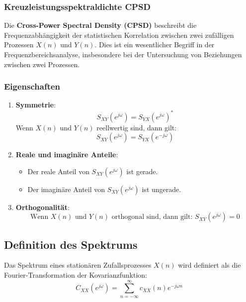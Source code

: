\documentclass[12pt]{article}
\begin{document}
   \subsubsection{Kreuzleistungsspektraldichte CPSD}
      Die \textbf{Cross-Power Spectral Density (CPSD)} beschreibt die Frequenzabhängigkeit der statistischen Korrelation zwischen zwei zufälligen Prozessen \(X(n)\) und \(Y(n)\). Dies ist ein wesentlicher Begriff in der Frequenzbereichsanalyse, insbesondere bei der Untersuchung von Beziehungen zwischen zwei Prozessen.

   \subsubsection*{Eigenschaften}
      \begin{enumerate}
      \item \textbf{Symmetrie}:
      \[
         S_{XY}(e^{j\omega}) = S_{YX}(e^{j\omega})^*  %
      \]
      Wenn \(X(n)\) und \(Y(n)\) reellwertig sind, dann gilt:
      \[
         S_{XY}(e^{j\omega}) = S_{YX}(e^{-j\omega})
      \]

      \item \textbf{Reale und imaginäre Anteile}:
      \begin{itemize}
         \item Der reale Anteil von \(S_{XY}(e^{j\omega})\) ist gerade.
         \item Der imaginäre Anteil von \(S_{XY}(e^{j\omega})\) ist ungerade.
      \end{itemize}

      \item \textbf{Orthogonalität}:
      \[
         \text{Wenn } X(n) \text{ und } Y(n) \text{ orthogonal sind, dann gilt: } S_{XY}(e^{j\omega}) = 0
      \]
      \end{enumerate}

   \newpage

   \subsection{Definition des Spektrums}

      Das Spektrum eines stationären Zufallsprozesses \(X(n)\) wird definiert als die Fourier-Transformation der Kovarianzfunktion:
      \[
         C_{XX}(e^{j\omega}) = \sum_{n=-\infty}^{\infty} c_{XX}(n) e^{-j\omega n}
      \]
\end{document}
